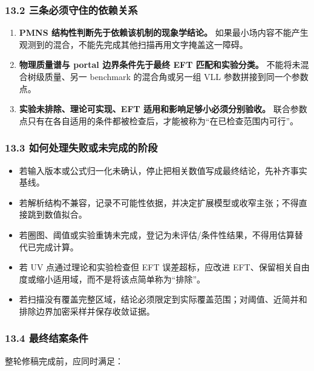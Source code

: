 \documentclass[
]{article}
\providecommand{\tightlist}{%
  \setlength{\itemsep}{0pt}\setlength{\parskip}{0pt}}
\begin{document}
\subsubsection{13.2
三条必须守住的依赖关系}\label{ux4e09ux6761ux5fc5ux987bux5b88ux4f4fux7684ux4f9dux8d56ux5173ux7cfb}

\begin{enumerate}
\def\labelenumi{\arabic{enumi}.}
\tightlist
\item
  \textbf{PMNS 结构性判断先于依赖该机制的现象学结论。}
  如果最小场内容不能产生观测到的混合，不能先完成其他扫描再用文字掩盖这一障碍。
\item
  \textbf{物理质量谱与 portal 边界条件先于最终 EFT 匹配和实验分类。}
  不能将未混合树级质量、另一 benchmark 的混合角或另一组 VLL
  参数拼接到同一个参数点。
\item
  \textbf{实验未排除、理论可实现、EFT 适用和影响足够小必须分别验收。}
  联合参数点只有在各自适用的条件都被检查后，才能被称为``在已检查范围内可行''。
\end{enumerate}

\subsubsection{13.3
如何处理失败或未完成的阶段}\label{ux5982ux4f55ux5904ux7406ux5931ux8d25ux6216ux672aux5b8cux6210ux7684ux9636ux6bb5}

\begin{itemize}
\tightlist
\item
  若输入版本或公式归一化未确认，停止把相关数值写成最终结论，先补齐事实基线。
\item
  若解析结构不兼容，记录不可能性依据，并决定扩展模型或收窄主张；不得直接跳到数值拟合。
\item
  若圈图、阈值或实验重铸未完成，登记为未评估/条件性结果，不得用估算替代已完成计算。
\item
  若 UV 点通过理论和实验检查但 EFT 误差超标，应改进
  EFT、保留相关自由度或缩小适用域，而不是将该点简单称为``排除''。
\item
  若扫描没有覆盖完整区域，结论必须限定到实际覆盖范围；对阈值、近简并和排除边界加密采样并保存收敛证据。
\end{itemize}

\subsubsection{13.4
最终结案条件}\label{ux6700ux7ec8ux7ed3ux6848ux6761ux4ef6}

整轮修稿完成前，应同时满足：
\end{document}
